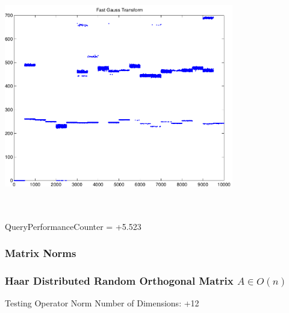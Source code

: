 \documentclass[9pt]{article}
\theoremstyle{plain}
\theoremstyle{definition}
\theoremstyle{remark}
\numberwithin{equation}{section}
\begin{document}
\includegraphics[width=10.0cm,height=10.0cm]{FGT20_Centers.pdf}

QueryPerformanceCounter  =  +5.523
\subsubsection{Matrix Norms}
\subsubsection{Haar Distributed Random Orthogonal Matrix $A \in O(n)$}
 Testing Operator Norm
Number of Dimensions: +12
\end{document}
